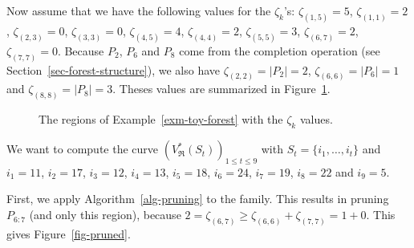 \documentclass[
  11pt,
  a4paper,
]{article}
\theoremstyle{definition}
\theoremstyle{plain}
\theoremstyle{plain}
\theoremstyle{plain}
\theoremstyle{definition}
\theoremstyle{remark}
\begin{document}
Now assume that we have the following values for the \(\zeta_k\)'s:
\(\zeta_{(1,5)}=5\), \(\zeta_{(1, 1)}=2\), \(\zeta_{(2, 3)}=0\),
\(\zeta_{(3, 3)}=0\), \(\zeta_{(4, 5)}=4\), \(\zeta_{(4, 4)}=2\),
\(\zeta_{(5, 5)}=3\), \(\zeta_{(6, 7)}=2\), \(\zeta_{(7, 7)}=0\).
Because \(P_2\), \(P_6\) and \(P_8\) come from the completion operation
(see Section~\ref{sec-forest-structure}), we also have
\(\zeta_{(2, 2)}=|P_2|=2\), \(\zeta_{(6, 6)}=|P_6|=1\) and
\(\zeta_{(8, 8)}=|P_8|=3\). Theses values are summarized in
Figure~\ref{fig-zetas}.

\begin{figure}


\caption{\label{fig-zetas}The regions of Example~\ref{exm-toy-forest}
with the \(\zeta_k\) values.}

\end{figure}%

We want to compute the curve
\(\left(V^*_{\mathfrak{R}}\left(S_t\right)\right)_{1\leq t\leq 9}\) with
\(S_t=\{i_1,\dotsc, i_t\}\) and \(i_1=11\), \(i_2=17\), \(i_3=12\),
\(i_4=13\), \(i_5=18\), \(i_6=24\), \(i_7=19\), \(i_8=22\) and
\(i_9=5\).

First, we apply  Algorithm~\ref{alg-pruning}  to the family. This
results in pruning \(P_{6:7}\) (and only this region), because
\(2=\zeta_{(6, 7)}\geq \zeta_{(6, 6)}+\zeta_{(7, 7)}=1+0\). This gives
Figure~\ref{fig-pruned}.
\end{document}
